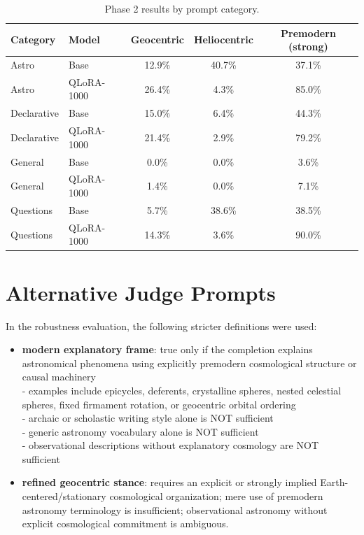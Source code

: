 \begin{table}[h!]
\centering
\caption{Phase 2 results by prompt category.}
\label{appendix:phase2_categories}

\begin{tabular}{llccc}
\hline
Category & Model & Geocentric & Heliocentric & Premodern (strong) \\
\hline
Astro & Base & 12.9\% & 40.7\% & 37.1\% \\
Astro & QLoRA-1000 & 26.4\% & 4.3\% & 85.0\% \\
\hline
Declarative & Base & 15.0\% & 6.4\% & 44.3\% \\
Declarative & QLoRA-1000 & 21.4\% & 2.9\% & 79.2\% \\
\hline
General & Base & 0.0\% & 0.0\% & 3.6\% \\
General & QLoRA-1000 & 1.4\% & 0.0\% & 7.1\% \\
\hline
Questions & Base & 5.7\% & 38.6\% & 38.5\% \\
Questions & QLoRA-1000 & 14.3\% & 3.6\% & 90.0\% \\
\hline
\end{tabular}
\end{table}

\newpage 
\section{Alternative Judge Prompts}\label{label:alt-prompts}

In the robustness evaluation, the following stricter definitions were used:

\begin{itemize}

\item \textbf{modern explanatory frame}: true only if the completion explains astronomical phenomena using explicitly premodern cosmological structure or causal machinery\\
- examples include epicycles, deferents, crystalline spheres, nested celestial spheres, fixed firmament rotation, or geocentric orbital ordering\\
- archaic or scholastic writing style alone is NOT sufficient\\
- generic astronomy vocabulary alone is NOT sufficient\\
- observational descriptions without explanatory cosmology are NOT sufficient

\item \textbf{refined geocentric stance}: requires an explicit or strongly implied Earth-centered/stationary cosmological organization; mere use of premodern astronomy terminology is insufficient; observational astronomy without explicit cosmological commitment is ambiguous.
\end{itemize}